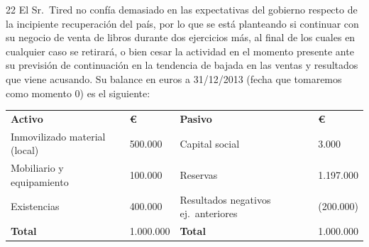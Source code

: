 \documentclass[10pt,a4paper,twoside]{article}
\newcommand{\thead}[1]{\leavevmode\sffamily\bfseries\color{white}#1}
\newcommand{\headrow}{\rowcolor{steel}}
\begin{document}
\begin{enunciado}{22}
El Sr.~Tired no confía demasiado en las expectativas del gobierno respecto de la incipiente recuperación del país, por
lo que se está planteando si continuar con su negocio de venta de libros durante dos ejercicios más, al final de los
cuales en cualquier caso se retirará, o bien cesar la actividad en el momento presente ante su previsión de
continuación en la tendencia de bajada en las ventas y resultados que viene acusando. Su balance en euros a 31/12/2013
(fecha que tomaremos como momento 0) es el siguiente:

\begin{center}\small
\begin{tabularx}{0.92\linewidth}{@{}L Q L Q@{}}
\headrow \thead{Activo} & \thead{€} & \thead{Pasivo} & \thead{€}\\
Inmovilizado material (local) & 500.000 & Capital social & 3.000\\
Mobiliario y equipamiento & 100.000 & Reservas & 1.197.000\\
Existencias & 400.000 & Resultados negativos ej.\ anteriores & (200.000)\\
\textbf{Total} & 1.000.000 & \textbf{Total} & 1.000.000\\
\end{tabularx}
\end{center}


\end{enunciado}
\end{document}
